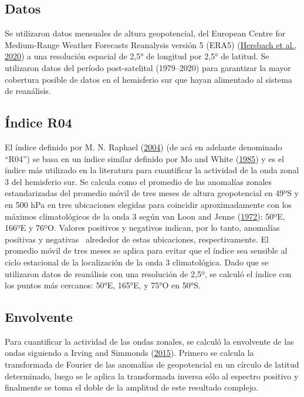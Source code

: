 \documentclass[12pt,oneside,a4paper]{reedthesis}
\begin{document}
\hypertarget{datos}{%
\subsection{Datos}\label{datos}}

Se utilizaron datos mensuales de altura geopotencial, del European Centre for Medium-Range Weather Forecasts Reanalysis versión 5 (ERA5) (\protect\hyperlink{ref-hersbach2020}{Hersbach et al., 2020}) a una resolución espacial de 2,5° de longitud por 2,5° de latitud.
Se utilizaron datos del período post-satelital (1979--2020) para garantizar la mayor cobertura posible de datos en el hemisferio sur que hayan alimentado al sistema de reanálisis.

\hypertarget{uxedndice-r04}{%
\subsection{Índice R04}\label{uxedndice-r04}}

El índice definido por M. N. Raphael (\protect\hyperlink{ref-raphael2004}{2004}) (de acá en adelante denominado ``R04'') se basa en un índice similar definido por Mo and White (\protect\hyperlink{ref-mo1985}{1985}) y es el índice más utilizado en la literatura para cuantificar la actividad de la onda zonal 3 del hemisferio sur.
Se calcula como el promedio de las anomalías zonales estandarizadas del promedio móvil de tres meses de altura geopotencial en 49ºS y en 500 hPa en tres ubicaciones elegidas para coincidir aproximadamente con los máximos climatológicos de la onda 3 según van Loon and Jenne (\protect\hyperlink{ref-vanloon1972}{1972}): 50ºE, 166ºE y 76ºO.
Valores positivos y negativos indican, por lo tanto, anomalías positivas y negativas~ alrededor de estas ubicaciones, respectivamente.
El promedio móvil de tres meses se aplica para evitar que el índice sea sensible al ciclo estacional de la localización de la onda 3 climatológica.
Dado que se utilizaron datos de reanálisis con una resolución de 2,5º, se calculó el índice con los puntos más cercanos: 50°E, 165°E, y 75°O en 50°S.

\hypertarget{envolvente}{%
\subsection{Envolvente}\label{envolvente}}

Para cuantificar la actividad de las ondas zonales, se calculó la envolvente de las ondas siguiendo a Irving and Simmonds (\protect\hyperlink{ref-irving2015}{2015}).
Primero se calcula la transformada de Fourier de las anomalías de geopotencial en un círculo de latitud determinado, luego se le aplica la transformada inversa sólo al espectro positivo y finalmente se toma el doble de la amplitud de este resultado complejo.
\end{document}
